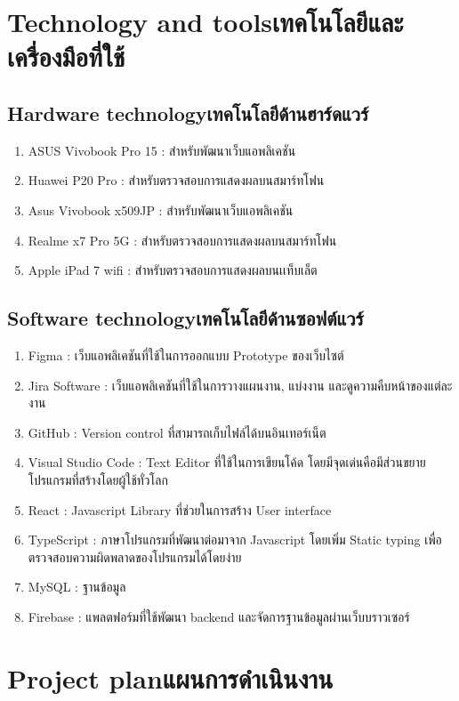 \section{\ifenglish Technology and tools\else เทคโนโลยีและเครื่องมือที่ใช้\fi}

\subsection{\ifenglish Hardware technology\else เทคโนโลยีด้านฮาร์ดแวร์\fi}
\begin{enumerate}
    \item ASUS Vivobook Pro 15 : สำหรับพัฒนาเว็บแอพลิเคชัน
    \item Huawei P20 Pro : สำหรับตรวจสอบการแสดงผลบนสมาร์ทโฟน
    \item Asus Vivobook x509JP : สำหรับพัฒนาเว็บแอพลิเคชัน
    \item Realme x7 Pro 5G : สำหรับตรวจสอบการแสดงผลบนสมาร์ทโฟน
    \item Apple iPad 7 wifi : สำหรับตรวจสอบการแสดงผลบนเเท็บเล็ต
\end{enumerate}
\subsection{\ifenglish Software technology\else เทคโนโลยีด้านซอฟต์แวร์\fi}
\begin{enumerate}
    \item Figma : เว็บแอพลิเคชันที่ใช้ในการออกแบบ Prototype ของเว็บไซต์
    \item Jira Software : เว็บแอพลิเคชันที่ใช้ในการวางแผนงาน, แบ่งงาน และดูความคืบหน้าของแต่ละงาน
    \item GitHub : Version control ที่สามารถเก็บไฟล์ได้บนอินเทอร์เน็ต
    \item Visual Studio Code : Text Editor ที่ใช้ในการเขียนโค้ด โดยมีจุดเด่นคือมีส่วนขยายโปรแกรมที่สร้างโดยผู้ใช้ทั่วโลก
    \item React : Javascript Library ที่ช่วยในการสร้าง User interface
    \item TypeScript : ภาษาโปรแกรมที่พัฒนาต่อมาจาก Javascript โดยเพิ่ม Static typing เพื่อตรวจสอบความผิดพลาดของโปรแกรมได้โดยง่าย
    \item MySQL : ฐานข้อมูล
    \item Firebase : แพลตฟอร์มที่ใช้พัฒนา backend และจัดการฐานข้อมูลผ่านเว็บบราวเซอร์
\end{enumerate}
\section{\ifenglish Project plan\else แผนการดำเนินงาน\fi}


